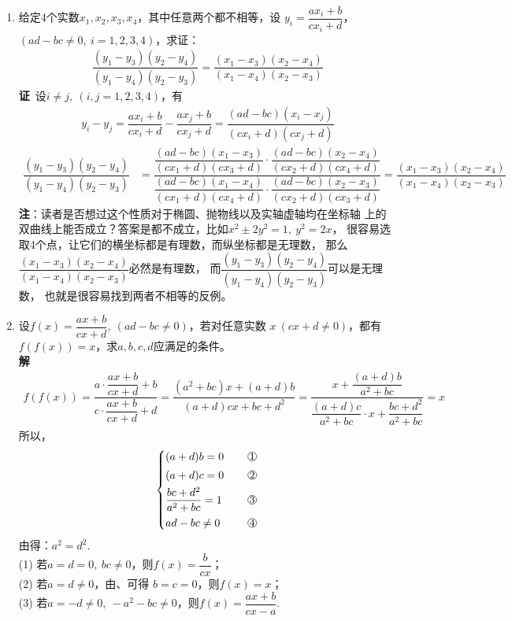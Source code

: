 \begin{enumerate}[label={【\textbf{例\thechapter.\arabic*}】},
 leftmargin=\inteval{\myenumleftmargin}pt,
 itemsep=\inteval{\myenumitempsep}pt,
 itemindent=\inteval{\myenumitemindent}pt]
\item \label{分式线性变换保交比例题}
给定4个实数$ x_1,x_2,x_3,x_4 $，其中任意两个都不相等，设
$ y_i=\dfrac{ax_i+b}{cx_i+d} $，$ (ad-bc\neq 0,\ i=1,2,3,4) $，求证：
\begin{gather}\label{分式线性变换保交比}
    \dfrac{(y_1-y_3)(y_2-y_4)}{(y_1-y_4)(y_2-y_3)}=
    \dfrac{(x_1-x_3)(x_2-x_4)}{(x_1-x_4)(x_2-x_3)}
\end{gather}
\textbf{证}\ 设$ i\neq j,\ (i,j=1,2,3,4) $，有
\begin{gather*}
    y_i-y_j=\dfrac{ax_i+b}{cx_i+d}-\dfrac{ax_j+b}{cx_j+d}=
    \dfrac{(ad-bc)(x_i-x_j)}{(cx_i+d)(cx_j+d)}
\end{gather*}
\begin{align*}
    \dfrac{(y_1-y_3)(y_2-y_4)}{(y_1-y_4)(y_2-y_3)} &=
    \dfrac{\dfrac{(ad-bc)(x_1-x_3)}{(cx_1+d)(cx_3+d)}\cdot
        \dfrac{(ad-bc)(x_2-x_4)}{(cx_2+d)(cx_4+d)}}{
        \dfrac{(ad-bc)(x_1-x_4)}{(cx_1+d)(cx_4+d)}\cdot
        \dfrac{(ad-bc)(x_2-x_3)}{(cx_2+d)(cx_3+d)} }
    =\dfrac{(x_1-x_3)(x_2-x_4)}{(x_1-x_4)(x_2-x_3)}
\end{align*}
\textbf{注}：读者是否想过这个性质对于椭圆、抛物线以及实轴虚轴均在坐标轴
上的双曲线上能否成立？答案是都不成立，比如$x^2\pm 2y^2=1,\ y^2=2x$，
很容易选取4个点，让它们的横坐标都是有理数，而纵坐标都是无理数，
那么$ \dfrac{(x_1-x_3)(x_2-x_4)}{(x_1-x_4)(x_2-x_3)} $必然是有理数，
而$ \dfrac{(y_1-y_3)(y_2-y_4)}{(y_1-y_4)(y_2-y_3)} $可以是无理数，
也就是很容易找到两者不相等的反例。

\item 设$ f(x)=\dfrac{ax+b}{cx+d},\ (ad-bc\neq 0) $，若对任意实数
$ x\ (cx+d\neq 0) $，都有$ f(f(x))=x $，求$ a,b,c,d $应满足的条件。\\
\textbf{解}\ 
\begin{gather*}
    f(f(x))=\dfrac{a\cdot\dfrac{ax+b}{cx+d}+b}{c\cdot
        \dfrac{ax+b}{cx+d}+d}=
    \dfrac{(a^2+bc)x+(a+d)b}{(a+d)cx+bc+d^2}=
    \dfrac{x+\dfrac{(a+d)b}{a^2+bc}}{\dfrac{(a+d)c}{a^2+bc}
        \cdot x+ \dfrac{bc+d^2}{a^2+bc}}=x
\end{gather*}
所以，
\begin{align*}
    \begin{dcases}
        (a+d)b=0\q  & \mycircled{1} \\
        (a+d)c=0\q  & \mycircled{2} \\
        \dfrac{bc+d^2}{a^2+bc}=1\q  & \mycircled{3} \\
        ad-bc\neq 0\q  & \mycircled{4}
    \end{dcases}
\end{align*}
由得：$ a^2=d^2 $. \\
(1) 若$ a=d=0,\ bc\neq 0 $，则$ f(x)=\dfrac{b}{cx} $；\\
(2) 若$ a=d\neq 0 $，由、可得
$ b=c=0 $，则$ f(x)=x $；\\
(3) 若$ a=-d\neq 0,\ -a^2-bc\neq 0 $，则$ f(x)=\dfrac{ax+b}{cx-a} $.


\end{enumerate}
